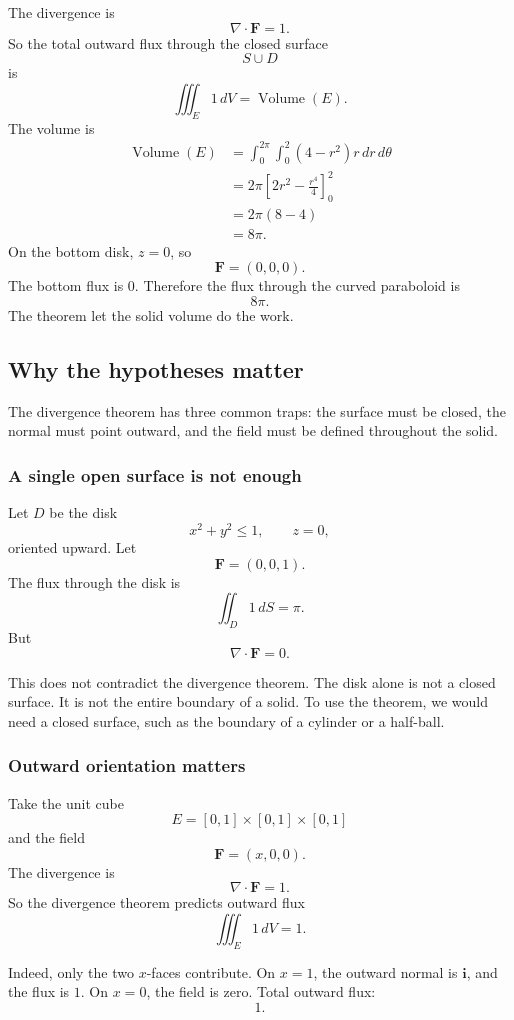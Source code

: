 The divergence is
\[
    \nabla\cdot\mathbf F=1.
\]
So the total outward flux through the closed surface
\[
    S\cup D
\]
is
\[
    \iiint_E 1\,dV=\operatorname{Volume}(E).
\]
The volume is
\[
\begin{aligned}
\operatorname{Volume}(E)
&=
\int_0^{2\pi}\int_0^2(4-r^2)r\,dr\,d\theta\\
&=
2\pi\left[2r^2-\frac{r^4}{4}\right]_0^2\\
&=
2\pi(8-4)\\
&=
8\pi.
\end{aligned}
\]
On the bottom disk, \(z=0\), so
\[
    \mathbf F=(0,0,0).
\]
The bottom flux is \(0\).  Therefore the flux through the curved paraboloid is
\[
\boxed{
    8\pi.
}
\]
The theorem let the solid volume do the work.

\subsection{Why the hypotheses matter}

The divergence theorem has three common traps: the surface must be closed, the normal
must point outward, and the field must be defined throughout the solid.

\subsubsection*{A single open surface is not enough}

Let \(D\) be the disk
\[
    x^2+y^2\le1,\qquad z=0,
\]
oriented upward.  Let
\[
    \mathbf F=(0,0,1).
\]
The flux through the disk is
\[
    \iint_D 1\,dS=\pi.
\]
But
\[
    \nabla\cdot\mathbf F=0.
\]

This does not contradict the divergence theorem.  The disk alone is not a closed
surface.  It is not the entire boundary of a solid.  To use the theorem, we would need a
closed surface, such as the boundary of a cylinder or a half-ball.

\subsubsection*{Outward orientation matters}

Take the unit cube
\[
    E=[0,1]\times[0,1]\times[0,1]
\]
and the field
\[
    \mathbf F=(x,0,0).
\]
The divergence is
\[
    \nabla\cdot\mathbf F=1.
\]
So the divergence theorem predicts outward flux
\[
    \iiint_E 1\,dV=1.
\]

Indeed, only the two \(x\)-faces contribute.  On \(x=1\), the outward normal is
\(\mathbf i\), and the flux is \(1\).  On \(x=0\), the field is zero.  Total outward flux:
\[
    1.
\]

